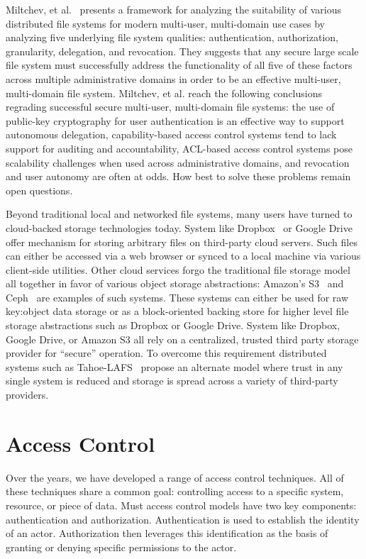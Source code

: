 Miltchev, et al.~\cite{miltchev2008} presents a framework for
analyzing the suitability of various distributed file systems for
modern multi-user, multi-domain use cases by analyzing five underlying
file system qualities: authentication, authorization, granularity,
delegation, and revocation. They suggests that any secure large scale
file system must successfully address the functionality of all five of
these factors across multiple administrative domains in order to be an
effective multi-user, multi-domain file system. Miltchev, et al. reach
the following conclusions regrading successful secure multi-user,
multi-domain file systems: the use of public-key cryptography for user
authentication is an effective way to support autonomous delegation,
capability-based access control systems tend to lack support for
auditing and accountability, ACL-based access control systems pose
scalability challenges when used across administrative domains, and
revocation and user autonomy are often at odds. How best to solve
these problems remain open questions.

Beyond traditional local and networked file systems, many users have
turned to cloud-backed storage technologies today. System like
Dropbox~\cite{dropbox} or Google Drive~\cite{google-drive} offer
mechanism for storing arbitrary files on third-party cloud
servers. Such files can either be accessed via a web browser or synced
to a local machine via various client-side utilities. Other cloud
services forgo the traditional file storage model all together in
favor of various object storage abstractions: Amazon's
S3~\cite{amazon-s3} and Ceph~\cite{ceph} are examples of such
systems. These systems can either be used for raw key:object data
storage or as a block-oriented backing store for higher level file
storage abstractions such as Dropbox or Google Drive. System like
Dropbox, Google Drive, or Amazon S3 all rely on a centralized, trusted
third party storage provider for ``secure'' operation. To overcome
this requirement distributed systems such as
Tahoe-LAFS~\cite{wilcox-o'hearn2008} propose an alternate model where
trust in any single system is reduced and storage is spread across a
variety of third-party providers.

\section{Access Control}
\label{chap:background:ac}

Over the years, we have developed a range of access control
techniques. All of these techniques share a common goal: controlling
access to a specific system, resource, or piece of data. Must access
control models have two key components: authentication and
authorization.  Authentication is used to establish the identity of an
actor. Authorization then leverages this identification as the basis
of granting or denying specific permissions to the actor.

